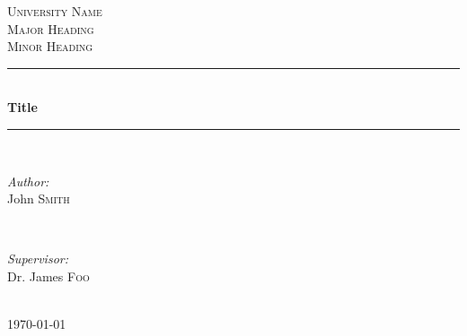 \documentclass[12pt]{article} %
\begin{document}

\begin{titlepage}

\newcommand{\HRule}{\rule{\linewidth}{0.5mm}} %

\center %

\textsc{\LARGE University Name}\\[1.5cm] %
\textsc{\Large Major Heading}\\[0.5cm] %
\textsc{\large Minor Heading}\\[0.5cm] %

\HRule \\[0.4cm]
{ \huge \bfseries Title}\\[0.4cm] %
\HRule \\[1.5cm]

\begin{minipage}{0.4\textwidth}
\begin{flushleft} \large
\emph{Author:}\\
John \textsc{Smith} %
\end{flushleft}
\end{minipage}
~
\begin{minipage}{0.4\textwidth}
\begin{flushright} \large
\emph{Supervisor:} \\
Dr. James \textsc{Foo} %
\end{flushright}
\end{minipage}\\[4cm]

{\large \today}\\[3cm] %


\vfill %

\end{titlepage}



\end{document}
